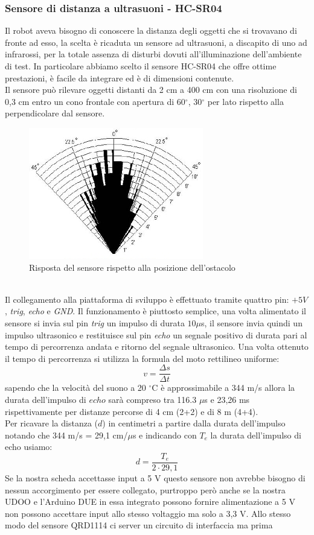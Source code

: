 \subsubsection{Sensore di distanza a ultrasuoni - HC-SR04}
Il robot aveva bisogno di conoscere la distanza degli oggetti che si trovavano 
di fronte ad esso, la scelta è ricaduta un sensore ad ultrasuoni, a discapito di
 uno ad infrarossi, per la totale assenza di disturbi dovuti all'illuminazione 
 dell'ambiente di test. In particolare abbiamo scelto il sensore HC-SR04 che 
 offre ottime prestazioni, è facile da integrare ed è di dimensioni contenute.\\
Il sensore può rilevare oggetti distanti da 2 cm a 400 cm con una risoluzione 
di 0,3 cm entro un cono frontale con apertura di 60$^\circ$, 30$^\circ$ per lato 
rispetto alla perpendicolare dal sensore.
\begin{figure}[!htb] \center
\includegraphics[scale=0.6]{immagini/HC-SR04_Angle.png}
\caption{Risposta del sensore rispetto alla posizione dell'ostacolo} 
\end{figure}
\\Il collegamento alla piattaforma di sviluppo è effettuato tramite quattro pin: 
\textit{$+5V$}, \textit{trig}, \textit{echo} e \textit{GND}.
Il funzionamento è piuttosto semplice, una volta alimentato il sensore si invia 
sul pin \textit{trig} un impulso di durata $10 \mu$s, il sensore invia 
quindi un impulso ultrasonico e restituisce sul pin \textit{echo} un segnale 
positivo di durata pari al tempo di percorrenza andata e ritorno del segnale 
ultrasonico. Una volta ottenuto il tempo di percorrenza si utilizza la formula 
del moto rettilineo uniforme:
$$v = \frac{\Delta s}{\Delta t}$$
sapendo che la velocità del suono a 20 $^\circ$C è approssimabile a 344 m/s allora 
la durata dell'impulso di $echo$ sarà compreso tra 116.3 $\mu$s e 23,26 ms 
rispettivamente per distanze percorse di 4 cm (2+2) e di 8 m (4+4).
\\Per ricavare la distanza ($d$) in centimetri a partire dalla durata dell'impulso 
notando che 344 m/s = 29,1 cm/$\mu$s e indicando con $T_e$ la durata dell'impulso 
di echo usiamo:
$$d=\frac{T_e}{2\cdot29,1}$$
Se la nostra scheda accettasse input a 5 V questo sensore non avrebbe bisogno di 
nessun accorgimento per essere collegato, purtroppo però anche se la nostra UDOO 
e l'Arduino DUE in essa integrato possono fornire alimentazione a 5 V non possono 
accettare input allo stesso voltaggio ma solo a 3,3 V. Allo stesso modo del 
sensore QRD1114 ci server un circuito di interfaccia ma prima 

